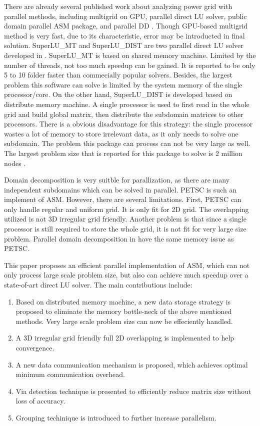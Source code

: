 \documentclass{sig-alternate}
\begin{document}
	There are already several published work about analyzing power grid with parallel methods, including multigrid on GPU\cite{Zhuofeng}, parallel direct LU 
	solver\cite{Super_LU_website}, public domain parallel ASM package\cite{PETSC_website}, and parallel DD
	\cite{kaisun, voronov}. Though GPU-based multigrid method\cite{Zhuofeng} is very fast, due to its characteristic, error may be
	introducted in final solution. SuperLU\_MT and SuperLU\_DIST are two parallel direct LU solver developed in \cite{Super_LU_website}. SuperLU\_MT is 
	based on shared memory machine. Limited by the number of threads, not too much speedup can be gained. 
	It is reported to be only 5 to 10 folder faster than commecially popular solvers\cite{Super_LU_website}. Besides, the largest 
	problem this software can solve is limited by the system memory of the single processor/core. On the other hand, SuperLU\_DIST 
	is developed based on distribute memory machine. A single processor is used to first read in the whole grid and build global 
	matrix, then distribute the subdomain matrices to other processors. 
	There is a obvious disadvantage for this strategy: the single processor wastes a lot of memory to store irrelevant data, as 
	it only needs to solve one subdomain. The problem this package can 
	process can not be very large as well. The largest problem size that is reported for this package to solve is 2 million nodes
	\cite{Super_LU_website}.

	Domain decomposition is very suitble for parallization, as there are many independent subdomains which can be
	solved in parallel. PETSC\cite{PETSC_website} is such an implement of ASM.
	However, there are several limitations. First, PETSC can only handle regular and uniform grid. It is only fit for 2D grid. 
	The overlapping utilized is not 3D irregular grid friendly. Another problem is that since a single processor is 
	still required to
	store the whole grid, it is not fit for very large size problem. Parallel domain decomposition in \cite{kaisun, voronov} have
	the same memory issue as PETSC.

	This paper proposes an efficient parallel implementation of ASM, which can not only process large scale problem size, 
	but also can achieve much speedup over a state-of-art direct LU solver. The main contributions include:
	\begin{enumerate}[1)]
	\item Based on distributed memory machine, a new data storage strategy is proposed to eliminate the memory bottle-neck of
	the above mentioned methods. Very large scale problem size can now be effeciently handled.
	\item A 3D irregular grid friendly full 2D overlapping is implemented to help convergence. 
	\item A new data communication mechanism is proposed, which achieves optimal minimum communication overhead.
	\item Via detection technique is presented to efficiently reduce matrix size without loss of accuracy.
	\item Grouping techinique is introduced to further increase parallelism.
	\end{enumerate}
\end{document}
